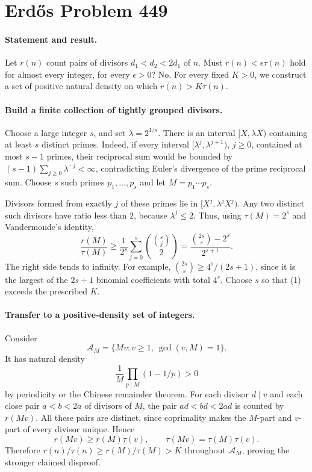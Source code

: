 \section*{Erd\H{o}s Problem 449}

\paragraph{Statement and result.}
Let \(r(n)\) count pairs of divisors \(d_1<d_2<2d_1\) of \(n\).
Must \(r(n)<\epsilon\tau(n)\) hold for almost every integer, for
every \(\epsilon>0\)?
No. For every fixed \(K>0\), we construct a set of positive natural
density on which \(r(n)>K\tau(n)\).

\paragraph{Build a finite collection of tightly grouped divisors.}
Choose a large integer \(s\), and set \(\lambda=2^{1/s}\).
There is an interval \([X,\lambda X)\) containing at least \(s\)
distinct primes. Indeed, if every interval
\([\lambda^j,\lambda^{j+1})\), \(j\geq0\), contained at most \(s-1\)
primes, their reciprocal sum would be bounded by
\((s-1)\sum_{j\geq0}\lambda^{-j}<\infty\), contradicting Euler's
divergence of the prime reciprocal sum.
Choose \(s\) such primes \(p_1,\ldots,p_s\) and let \(M=p_1\cdots p_s\).

Divisors formed from exactly \(j\) of these primes lie in
\([X^j,\lambda^jX^j)\). Any two distinct such divisors have ratio
less than \(2\), because \(\lambda^j\leq2\).
Thus, using \(\tau(M)=2^s\) and Vandermonde's identity,
\[
 \frac{r(M)}{\tau(M)}
 \geq\frac1{2^s}\sum_{j=0}^{s}\binom{\binom sj}{2}
 =\frac{\binom{2s}{s}-2^s}{2^{s+1}}.
 \tag{1}
\]
The right side tends to infinity. For example,
\(\binom{2s}{s}\geq4^s/(2s+1)\), since it is the largest of the
\(2s+1\) binomial coefficients with total \(4^s\).
Choose \(s\) so that (1) exceeds the prescribed \(K\).

\paragraph{Transfer to a positive-density set of integers.}
Consider
\[
 \mathcal A_M=\{Mv:v\geq1,\ \gcd(v,M)=1\}.
\]
It has natural density
\[
 \frac1M\prod_{p\mid M}(1-1/p)>0
 \tag{2}
\]
by periodicity or the Chinese remainder theorem.
For each divisor \(d\mid v\) and each close pair \(a<b<2a\)
of divisors of \(M\), the pair \(ad<bd<2ad\) is counted by \(r(Mv)\).
All these pairs are distinct, since coprimality makes the
\(M\)-part and \(v\)-part of every divisor unique. Hence
\[
 r(Mv)\geq r(M)\tau(v),\qquad
 \tau(Mv)=\tau(M)\tau(v).
\]
Therefore \(r(n)/\tau(n)\geq r(M)/\tau(M)>K\) throughout
\(\mathcal A_M\), proving the stronger claimed disproof.

